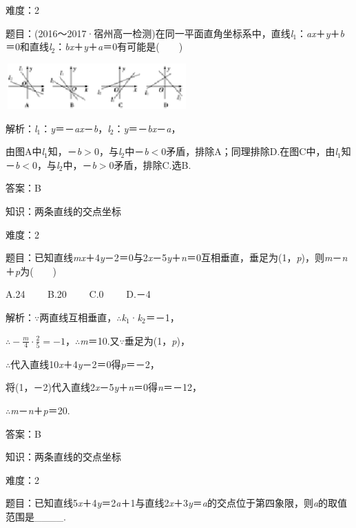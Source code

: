 \documentclass{article} %
\begin{document}
难度：2

题目：(2016～2017·宿州高一检测)在同一平面直角坐标系中，直线\textit{l}${}_{1}$：\textit{ax}＋\textit{y}＋\textit{b}＝0和直线\textit{l}${}_{2}$：\textit{bx}＋\textit{y}＋\textit{a}＝0有可能是(　　)

\includegraphics*[width=2.76in, height=0.69in, keepaspectratio=false]{image284}

解析：\textit{l}${}_{1}$：\textit{y}＝－\textit{ax}－\textit{b}，\textit{l}${}_{2}$：\textit{y}＝－\textit{bx}－\textit{a}，

由图A中\textit{l}${}_{1}$知，－\textit{b}$\mathrm{>}$0，与\textit{l}${}_{2}$中－\textit{b}$\mathrm{<}$0矛盾，排除A；同理排除D.在图C中，由\textit{l}${}_{1}$知－\textit{b}$\mathrm{<}$0，与\textit{l}${}_{2}$中，－\textit{b}$\mathrm{>}$0矛盾，排除C.选B.

答案：B



知识：两条直线的交点坐标

难度：2

题目：已知直线\textit{mx}＋4\textit{y}－2＝0与2\textit{x}－5\textit{y}＋\textit{n}＝0互相垂直，垂足为(1，\textit{p})，则\textit{m}－\textit{n}＋\textit{p}为(　　)

A.24　　 B.20　　 C.0　　 D.－4

解析：$\mathrm{\because}$两直线互相垂直，$\mathrm{\therefore}$\textit{k}${}_{1}$·\textit{k}${}_{2}$＝－1，

$\mathrm{\therefore}-\frac{m}{4}\cdot\frac{2}{5}=-1$，$\mathrm{\therefore}$\textit{m}＝10.又$\mathrm{\because}$垂足为(1，\textit{p})，

$\mathrm{\therefore}$代入直线10\textit{x}＋4\textit{y}－2＝0得\textit{p}＝－2，

将(1，－2)代入直线2\textit{x}－5\textit{y}＋\textit{n}＝0得\textit{n}＝－12，

$\mathrm{\therefore}$\textit{m}－\textit{n}＋\textit{p}＝20.

答案：B

知识：两条直线的交点坐标

难度：2

题目：已知直线5\textit{x}＋4\textit{y}＝2\textit{a}＋1与直线2\textit{x}＋3\textit{y}＝\textit{a}的交点位于第四象限，则\textit{a}的取值范围是\_\_\textit{}\_\_.
\end{document}
